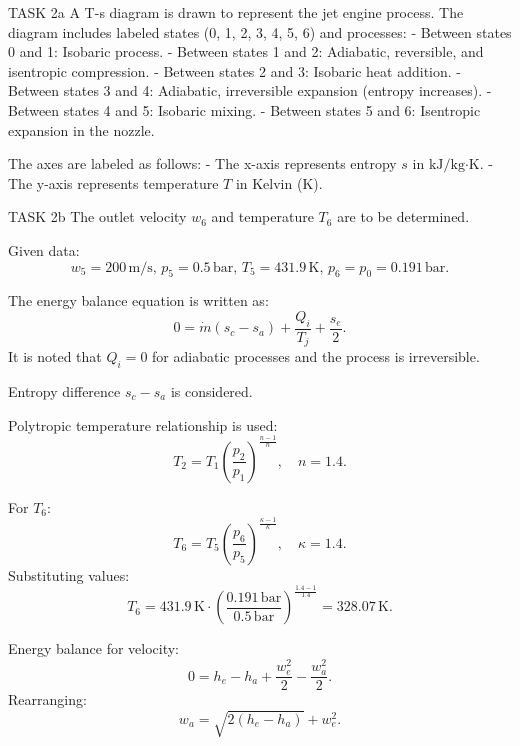 TASK 2a  
A T-s diagram is drawn to represent the jet engine process. The diagram includes labeled states (0, 1, 2, 3, 4, 5, 6) and processes:  
- Between states 0 and 1: Isobaric process.  
- Between states 1 and 2: Adiabatic, reversible, and isentropic compression.  
- Between states 2 and 3: Isobaric heat addition.  
- Between states 3 and 4: Adiabatic, irreversible expansion (entropy increases).  
- Between states 4 and 5: Isobaric mixing.  
- Between states 5 and 6: Isentropic expansion in the nozzle.  

The axes are labeled as follows:  
- The x-axis represents entropy \( s \) in \( \text{kJ}/\text{kg·K} \).  
- The y-axis represents temperature \( T \) in Kelvin (K).  

TASK 2b  
The outlet velocity \( w_6 \) and temperature \( T_6 \) are to be determined.  

Given data:  
\[
w_5 = 200 \, \text{m/s}, \, p_5 = 0.5 \, \text{bar}, \, T_5 = 431.9 \, \text{K}, \, p_6 = p_0 = 0.191 \, \text{bar}.
\]

The energy balance equation is written as:  
\[
0 = \dot{m} (s_c - s_a) + \frac{Q_i}{T_j} + \frac{s_e}{2}.
\]  
It is noted that \( Q_i = 0 \) for adiabatic processes and the process is irreversible.  

Entropy difference \( s_c - s_a \) is considered.  

Polytropic temperature relationship is used:  
\[
T_2 = T_1 \left( \frac{p_2}{p_1} \right)^{\frac{n-1}{n}}, \quad n = 1.4.
\]  

For \( T_6 \):  
\[
T_6 = T_5 \left( \frac{p_6}{p_5} \right)^{\frac{\kappa - 1}{\kappa}}, \quad \kappa = 1.4.
\]  
Substituting values:  
\[
T_6 = 431.9 \, \text{K} \cdot \left( \frac{0.191 \, \text{bar}}{0.5 \, \text{bar}} \right)^{\frac{1.4 - 1}{1.4}} = 328.07 \, \text{K}.
\]

Energy balance for velocity:  
\[
0 = h_e - h_a + \frac{w_e^2}{2} - \frac{w_a^2}{2}.
\]  
Rearranging:  
\[
w_a = \sqrt{2 (h_e - h_a)} + w_e^2.
\]